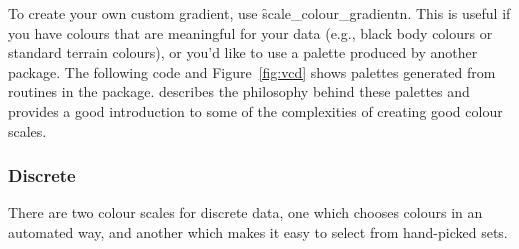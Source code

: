 % 



To create your own custom gradient, use \f{scale_colour_gradientn}. This is useful if you have colours that are meaningful for your data (e.g., black body colours or standard terrain colours), or you'd like to use a palette produced by another package. The following code and Figure~\ref{fig:vcd} shows palettes generated from routines in the  package. \citet{zeileis:2008} describes the philosophy behind these palettes and provides a good introduction to some of the complexities of creating good colour scales.

% 


\subsubsection{Discrete}
\label{ssub:colour-discrete}

There are two colour scales for discrete data, one which chooses colours in an automated way, and another which makes it easy to select from hand-picked sets.

